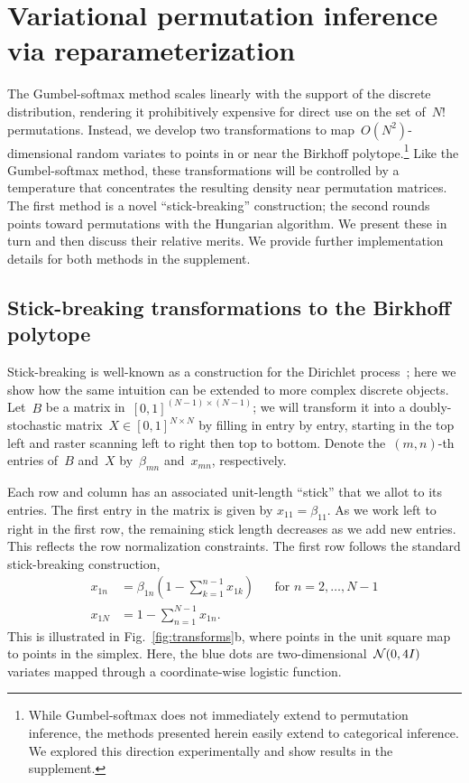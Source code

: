 \documentclass[twoside]{article}
\begin{document}
\section{Variational permutation inference via reparameterization}
\label{sec:permutation}
The Gumbel-softmax method scales linearly with the support of the
discrete distribution, rendering it prohibitively expensive for direct
use on the set of~$N!$ permutations.  Instead, we develop two
transformations to map~$O(N^2)$-dimensional random variates to points
in or near the Birkhoff polytope.\footnote{While Gumbel-softmax does
  not immediately extend to permutation inference, the methods
  presented herein easily extend to categorical inference.  We
  explored this direction experimentally and show results in the
  supplement.}  Like the Gumbel-softmax method, these transformations
will be controlled by a temperature that concentrates the resulting
density near permutation matrices.  The first method is a novel
``stick-breaking'' construction; the second rounds points toward
permutations with the Hungarian algorithm.  We present these in turn
and then discuss their relative merits. We provide further
implementation details for both methods in the supplement.

\subsection{Stick-breaking transformations to the Birkhoff polytope}
\label{sub:stickbreaking}

Stick-breaking is well-known as a construction for the Dirichlet
process~\citep{sethuraman1994constructive}; here we show how the
same intuition can be extended to more complex discrete objects. 
Let~$B$ be a matrix in~${[0,1]^{(N-1) \times (N-1)}}$; we will
transform it into a doubly-stochastic
matrix~${X \in [0,1]^{N \times N}}$ by filling in entry by entry, starting
in the top left and raster scanning left to right then top to
bottom. Denote the~$(m,n)$-th entries of~$B$ and~$X$ by~$\beta_{mn}$
and~${x}_{mn}$, respectively.

Each row and column has an associated unit-length ``stick'' that we
allot to its entries.  The first entry in the matrix is given by
$x_{11} = \beta_{11}$.  As we work left to right in the first row, the
remaining stick length decreases as we add new entries. This reflects
the row normalization constraints.  The first row follows the standard
stick-breaking construction,
\begin{align*}
  x_{1n} &= \beta_{1n} \left(1 - \sum_{k=1}^{n-1} x_{1k} \right)  & &  \text{for } n=2, \ldots, N-1\\
  x_{1N} &= 1 - \sum_{n=1}^{N-1} x_{1n}.
\end{align*}
This is illustrated in Fig.~\ref{fig:transforms}b, where points in the
unit square map to points in the simplex. Here, the blue dots are
two-dimensional~$\mathcal{N}(0, 4I)$ variates mapped through a coordinate-wise
logistic function.
\end{document}
